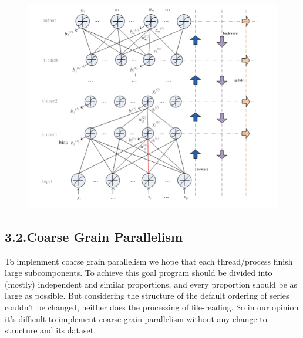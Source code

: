 \documentclass{article}
\begin{document}
\begin{figure}[tbp]%
\begin{mdcenter}%

\noindent{}\includegraphics[keepaspectratio=true,width=\dimmin{}{\dimwidth{0.90}}]{images/2016-02-21-21-15-24-}{}%

\mdhr{}%

\noindent{}%
\end{mdcenter}\label{fig-figure}%
\end{figure}%

\subsection{3.2.\hspace*{0.5em}Coarse Grain Parallelism}\label{sec-coarse-grain-parallelism}%

\noindent{}To implenment coarse grain parallelism we hope that each thread/process finish large subcomponents. To achieve this goal  program should be divided into (mostly) independent and similar proportions, and every proportion should be as large as possible. But considering the structure of  the default ordering of  series couldn't be changed, neither does the processing of file-reading. So in our opinion it's difficult to implement coarse grain parallelism without any change to  structure and its dataset.%
\end{document}
